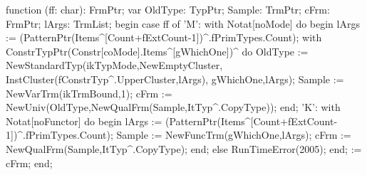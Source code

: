 \nwendcode{}\nwdocspar

\nwenddocs{}\endmoddef\nwstartdeflinemarkup{}\nwenddeflinemarkup
function (ff: char): FrmPtr;
var
   OldType: TypPtr;
   Sample: TrmPtr;
   cFrm: FrmPtr;
   lArgs: TrmList;
begin
   case ff of
      'M':
         with Notat[noMode] do
         begin
            lArgs := (PatternPtr(Items^[Count+fExtCount-1])^.fPrimTypes.Count);
            with  ConstrTypPtr(Constr[coMode].Items^[gWhichOne])^ do
               OldType := 
               NewStandardTyp(ikTypMode,NewEmptyCluster,
                              InstCluster(fConstrTyp^.UpperCluster,lArgs),
                              gWhichOne,lArgs);
            Sample := NewVarTrm(ikTrmBound,1);
            cFrm := NewUniv(OldType,NewQualFrm(Sample,ItTyp^.CopyType));
         end;
      'K':
         with Notat[noFunctor] do
         begin
            lArgs := (PatternPtr(Items^[Count+fExtCount-1])^.fPrimTypes.Count);
            Sample := NewFuncTrm(gWhichOne,lArgs);
            cFrm := NewQualFrm(Sample,ItTyp^.CopyType);
         end;
      else
         RunTimeError(2005);
   end;
    := cFrm;
end;
\eatline
{}\nwendcode{}\nwdocspar

